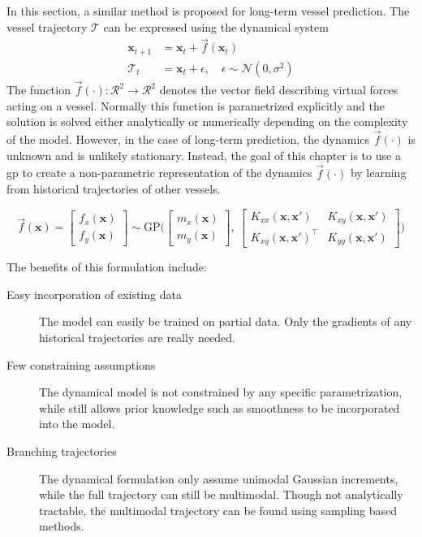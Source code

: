 In this section, a similar method is proposed for long-term vessel prediction. The vessel trajectory $\boldsymbol{\mathcal{T}}$ can be expressed using the dynamical system
\begin{subequations}
\begin{align}
    \boldsymbol{x}_{t+1} &= \boldsymbol{x}_t + \vec{f}(\boldsymbol{x}_t)\\
    \mathcal{T}_t &= \boldsymbol{x}_t + \epsilon, \quad \epsilon \sim \mathcal{N}(0, \sigma^2)
\end{align}
\end{subequations}
The function $\vec{f}(\cdot): \mathcal{R}^2 \to \mathcal{R}^2$ denotes the vector field describing virtual forces acting on a vessel. Normally this function is parametrized explicitly and the solution is solved either analytically or numerically depending on the complexity of the model. However, in the case of long-term prediction, the dynamics $\vec{f}(\cdot)$ is unknown and is unlikely stationary. Instead, the goal of this chapter is to use a \acrshort{gp} to create a non-parametric representation of the dynamics $\vec{f}(\cdot)$ by learning from historical trajectories of other vessels.

\begin{equation}\label{eq:gp_vec_field}
    \vec{f}(\boldsymbol{x}) = \begin{bmatrix} f_x (\boldsymbol{x})\\ f_y (\boldsymbol{x})\end{bmatrix} \sim \text{GP} \big(\begin{bmatrix} m_x(\boldsymbol{x})\\m_y(\boldsymbol{x})\end{bmatrix}, \ \begin{bmatrix}
    K_{xx}(\boldsymbol{x}, \boldsymbol{x}') & K_{xy}(\boldsymbol{x}, \boldsymbol{x}') \\ K_{xy}(\boldsymbol{x}, \boldsymbol{x}')^\intercal & K_{yy}(\boldsymbol{x}, \boldsymbol{x}')
    \end{bmatrix}\big) 
\end{equation}

The benefits of this formulation include:
\begin{description}
    \item[Easy incorporation of existing data] The model can easily be trained on partial data. Only the gradients of any historical trajectories are really needed.
    \item[Few constraining assumptions] The dynamical model is not constrained by any specific parametrization, while still allows prior knowledge such as smoothness to be incorporated into the model.
    \item[Branching trajectories] The dynamical formulation only assume unimodal Gaussian increments, while the full trajectory can still be multimodal. Though not analytically tractable, the multimodal trajectory can be found using sampling based methods. 
\end{description}

